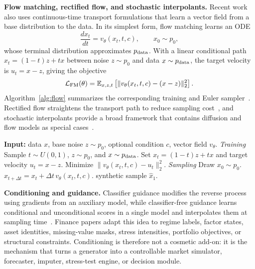 \documentclass[sigconf,nonacm]{acmart}
\begin{document}
\textbf{Flow matching, rectified flow, and stochastic interpolants.}
Recent work also uses continuous-time transport formulations that learn a vector
field from a base distribution to the data. In its simplest form, flow matching
learns an ODE
\begin{equation}
  \frac{d x_t}{dt}=v_\theta(x_t,t,c), \qquad x_0\sim p_0,
\end{equation}
whose terminal distribution approximates $p_{\rm data}$. With a linear
conditional path $x_t=(1-t)z+t x$ between noise $z\sim p_0$ and data
$x\sim p_{\rm data}$, the target velocity is $u_t=x-z$, giving the objective
\begin{equation}
  \mathcal{L}_{\rm FM}(\theta)=
  \mathbb{E}_{x,z,t}\left[\|v_\theta(x_t,t,c)-(x-z)\|_2^2\right].
\end{equation}
Algorithm~\ref{alg:flow} summarizes the corresponding training and Euler
sampler~\cite{lipman2023flow,holderrieth2026introflowdiffusion}. Rectified flow
straightens the transport path to reduce sampling cost~\cite{liu2023rectifiedflow},
and stochastic interpolants provide a broad framework that contains diffusion and
flow models as special cases~\cite{albergo2023interpolants}.

\begin{algorithm}[t]
\caption{Flow matching: training and sampling}
\label{alg:flow}
\small
\begin{algorithmic}[1]
\State \textbf{Input:} data $x$, base noise $z\sim p_0$, optional condition $c$, vector field $v_\theta$.
\Statex \textit{Training}
  \State Sample $t\sim U(0,1)$, $z\sim p_0$, and $x\sim p_{\rm data}$.
  \State Set $x_t=(1-t)z+t x$ and target velocity $u_t=x-z$.
  \State Minimize $\|v_\theta(x_t,t,c)-u_t\|_2^2$.
\EndFor
\Statex \textit{Sampling}
\State Draw $x_0\sim p_0$.
  \State $x_{t+\Delta t}=x_t+\Delta t\,v_\theta(x_t,t,c)$.
\EndFor
\State \Return synthetic sample $\hat{x}_1$.
\end{algorithmic}
\end{algorithm}

\textbf{Conditioning and guidance.}
Classifier guidance modifies the reverse process using gradients from an auxiliary model,
while classifier-free guidance learns conditional and unconditional scores in a
single model and interpolates them at sampling time~\cite{dhariwal2021beatgan,
ho2022cfg}. Finance papers adapt this idea to regime labels, factor states,
asset identities, missing-value masks, stress intensities, portfolio objectives,
or structural constraints. Conditioning is therefore not a cosmetic add-on: it is
the mechanism that turns a generator into a controllable market simulator,
forecaster, imputer, stress-test engine, or decision module.
\end{document}
